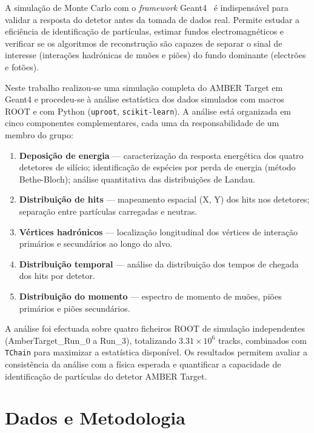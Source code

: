 \documentclass[12pt,a4paper]{article}
\begin{document}
A simulação de Monte Carlo com o \textit{framework} Geant4~\cite{geant4} é
indispensável para validar a resposta do detetor antes da tomada de dados real.
Permite estudar a eficiência de identificação de partículas, estimar fundos
electromagnéticos e verificar se os algoritmos de reconstrução são capazes de
separar o sinal de interesse (interações hadrónicas de muões e piões) do fundo
dominante (electrões e fotões).

Neste trabalho realizou-se uma simulação completa do AMBER Target em Geant4 e
procedeu-se à análise estatística dos dados simulados com macros ROOT e com Python
(\texttt{uproot}, \texttt{scikit-learn}). A análise
está organizada em cinco componentes complementares, cada uma da responsabilidade
de um membro do grupo:

\begin{enumerate}
  \item \textbf{Deposição de energia} — caracterização da resposta energética dos
    quatro detetores de silício; identificação de espécies por perda de energia
    (método Bethe-Bloch); análise quantitativa das distribuições de Landau.
  \item \textbf{Distribuição de hits} — mapeamento espacial (X, Y) dos hits nos
    detetores; separação entre partículas carregadas e neutras.
  \item \textbf{Vértices hadrónicos} — localização longitudinal dos vértices de
    interação primários e secundários ao longo do alvo.
  \item \textbf{Distribuição temporal} — análise da distribuição dos tempos de
    chegada dos hits por detetor.
  \item \textbf{Distribuição do momento} — espectro de momento de muões, piões
    primários e piões secundários.
\end{enumerate}

A análise foi efectuada sobre quatro ficheiros ROOT de simulação independentes
(AmberTarget\_Run\_0 a Run\_3), totalizando $3.31 \times 10^6$ tracks, combinados
com \texttt{TChain} para maximizar a estatística disponível. Os resultados
permitem avaliar a consistência da análise com a física esperada e quantificar
a capacidade de identificação de partículas do detetor AMBER Target.

\section{Dados e Metodologia}
\end{document}
